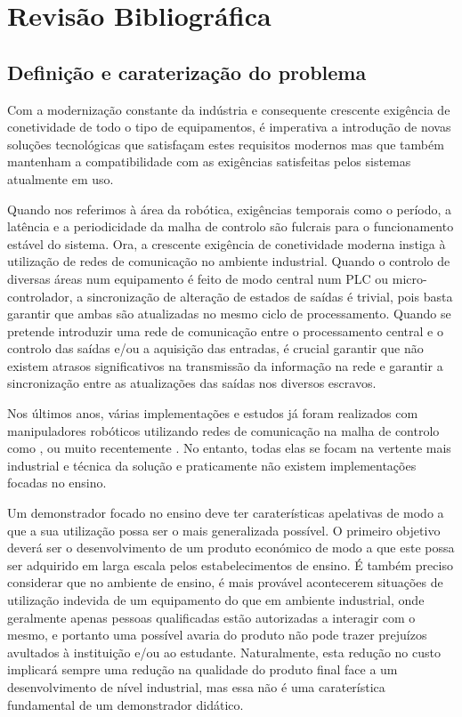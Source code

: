 \chapter{Revisão Bibliográfica} \label{chap:sota}


\section{Definição e caraterização do problema}\label{sec:problem}

Com a modernização constante da indústria e consequente crescente exigência
de conetividade de todo o tipo de equipamentos, é imperativa a introdução
de novas soluções tecnológicas que satisfaçam estes requisitos modernos
mas que também mantenham a compatibilidade com as exigências satisfeitas
pelos sistemas atualmente em uso.

Quando nos referimos à área da robótica, exigências temporais como o
período, a latência e a periodicidade da malha de controlo são fulcrais
para o funcionamento estável do sistema. Ora, a crescente exigência de
conetividade moderna instiga à utilização de redes de comunicação no
ambiente industrial. Quando o controlo de diversas áreas num equipamento
é feito de modo central num PLC ou micro-controlador, a sincronização de
alteração de estados de saídas é trivial, pois basta garantir que ambas
são atualizadas no mesmo ciclo de processamento. Quando se pretende
introduzir uma rede de comunicação entre o processamento central e o
controlo das saídas e/ou a aquisição das entradas, é crucial garantir
que não existem atrasos significativos na transmissão da informação
na rede e garantir a sincronização entre as atualizações das saídas
nos diversos escravos.

Nos últimos anos, várias implementações e estudos já foram realizados
com manipuladores robóticos utilizando redes de comunicação na malha de
controlo como \cite{Zhang18}, \cite{leiwang2010} ou muito recentemente
\cite{deremetz2020}. No entanto, todas elas se focam na vertente mais
industrial e técnica da solução e praticamente não existem implementações
focadas no ensino.

Um demonstrador focado no ensino deve ter caraterísticas apelativas de
modo a que a sua utilização possa ser o mais generalizada possível. O
primeiro objetivo deverá ser o desenvolvimento de um produto económico
de modo a que este possa ser adquirido em larga escala pelos
estabelecimentos de ensino. É também preciso considerar que no ambiente
de ensino, é mais provável acontecerem situações de utilização indevida
de um equipamento do que em ambiente industrial, onde geralmente apenas
pessoas qualificadas estão autorizadas a interagir com o mesmo, e portanto
uma possível avaria do produto não pode trazer prejuízos avultados à
instituição e/ou ao estudante. Naturalmente, esta redução no custo
implicará sempre uma redução na qualidade do produto final face a um
desenvolvimento de nível industrial, mas essa não é uma caraterística
fundamental de um demonstrador didático.

